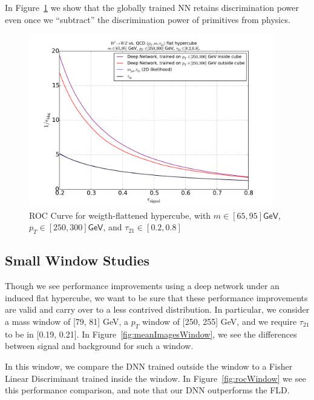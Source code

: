 In Figure~\ref{fig:rocCube} we show that the globally trained NN retains discrimination power even once we ``subtract'' the discrimination power of primitives from physics.

\begin{figure}[htbp]
  \centering
  \includegraphics[width=0.95\textwidth]{figures/roc-cube-inside.pdf}
  \caption{ROC Curve for weigth-flattened hypercube, with $m\in[65, 95]\mathsf{GeV}$,  $p_T\in[250, 300]\mathsf{GeV}$, and  $\tau_{21}\in[0.2, 0.8]$}
  \label{fig:rocCube}
\end{figure}




\subsection{Small Window Studies} %
\label{sub:small_window_studies}

Though we see performance improvements using a deep network under an induced flat hypercube, we want to be sure that these performance improvements are valid and carry over to a less contrived distribution. In particular, we consider a mass window of [79, 81] GeV, a $p_T$ window of [250, 255] GeV, and we require $\tau_21$ to be in [0.19, 0.21]. In Figure~\ref{fig:meanImagesWindow}, we see the differences between signal and background for such a window.




In this window, we compare the DNN trained outside the window to a Fisher Linear Discriminant trained inside the window. In Figure~\ref{fig:rocWindow} we see this performance comparison, and note that our DNN outperforms the FLD.

